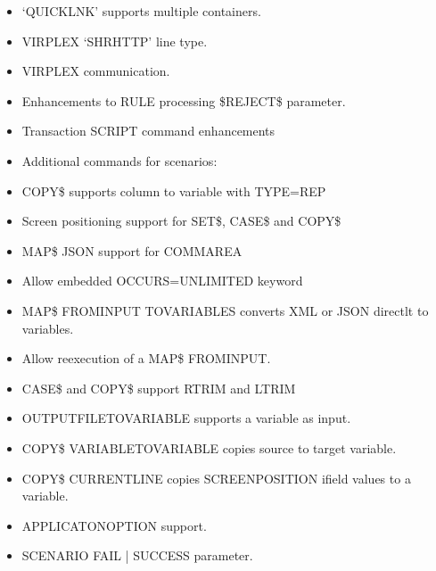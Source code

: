 \documentclass[letterpaper,10pt,english]{sphinxmanual}
\begin{document}
\sphinxAtStartPar
{}
\begin{itemize}
\item {} 
\sphinxAtStartPar
‘QUICKLNK’ supports multiple containers.

\item {} 
\sphinxAtStartPar
VIRPLEX ‘SHRHTTP’ line type.

\item {} 
\sphinxAtStartPar
VIRPLEX communication.

\item {} 
\sphinxAtStartPar
Enhancements to RULE processing \sphinxhyphen{} \$REJECT\$ parameter.

\item {} 
\sphinxAtStartPar
Transaction SCRIPT command enhancements

\item {} 
\sphinxAtStartPar
Additional commands for scenarios:

\item {} 
\sphinxAtStartPar
COPY\$ supports column to variable with TYPE=REP

\item {} 
\sphinxAtStartPar
Screen positioning support for SET\$, CASE\$ and COPY\$

\item {} 
\sphinxAtStartPar
MAP\$ JSON support for COMMAREA

\item {} 
\sphinxAtStartPar
Allow embedded OCCURS=UNLIMITED keyword

\item {} 
\sphinxAtStartPar
MAP\$ FROM\sphinxhyphen{}INPUT TO\sphinxhyphen{}VARIABLES converts XML or JSON directlt to variables.

\item {} 
\sphinxAtStartPar
Allow re\sphinxhyphen{}execution of a MAP\$ FROM\sphinxhyphen{}INPUT.

\item {} 
\sphinxAtStartPar
CASE\$ and COPY\$ support RTRIM and LTRIM

\item {} 
\sphinxAtStartPar
OUTPUT\sphinxhyphen{}FILE\sphinxhyphen{}TO\sphinxhyphen{}VARIABLE supports a variable as input.

\item {} 
\sphinxAtStartPar
COPY\$ VARIABLE\sphinxhyphen{}TO\sphinxhyphen{}VARIABLE copies source to target variable.

\item {} 
\sphinxAtStartPar
COPY\$ CURRENT\sphinxhyphen{}LINE copies SCREEN\sphinxhyphen{}POSITION ifield values to a variable.

\item {} 
\sphinxAtStartPar
APPLICATON\sphinxhyphen{}OPTION support.

\item {} 
\sphinxAtStartPar
SCENARIO FAIL | SUCCESS parameter.

\end{itemize}
\end{document}
